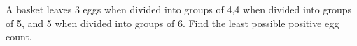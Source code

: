 A basket leaves 3 eggs when divided into groups of 4,4 when divided into groups of 5, and 5 when divided into groups of 6. Find the least possible positive egg count.
